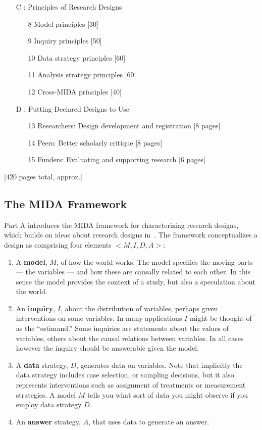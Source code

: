 \documentclass[11pt]{article}
\begin{document}
\begin{framed}
\begin{enumerate}
		\item[C]: Principles of Research Designs
		\begin{enumerate}
			\item[8] Model principles [30]
			\item[9] Inquiry principles [50]
			\item[10] Data strategy principles [60]
			\item[11] Analysis strategy principles [60]
			\item[12] Cross-MIDA principles [40]
		\end{enumerate}
	\item[D]: Putting Declared Designs to Use
				\begin{enumerate}
					\item[13] Researchers: Design development and registration [8 pages]				
					\item[14]  Peers: Better scholarly critique [8 pages]
          \item[15]  Funders: Evaluating and supporting research [6 pages]   
				\end{enumerate}
				
	\end{enumerate}
	[420 pages total, approx.]
\end{framed}


\subsection{The MIDA Framework}

Part A introduces the MIDA framework for characterizing research designs, which builds on ideas about research designs in~\cite{king1994designing}. The framework conceptualizes a design as comprising four elements $<M,I,D,A>$:
\begin{enumerate}
	\item A \textbf{model}, $M$, of how the world works. The model specifies the moving parts --- the variables --- and how these are causally related to each other. In this sense the model provides the context of a study, but also a speculation about the world.    
	\item An \textbf{inquiry}, $I$, about the distribution of variables, perhaps given interventions on some variables.  In many applications $I$ might be thought of as the ``estimand.'' Some inquiries are statements about the values of variables, others about the causal relations between variables. In all cases however the inquiry should be answerable given the model.   
	\item A \textbf{data} strategy, $D$, generates data on variables.  Note that implicitly the data strategy includes case selection, or sampling decisions, but it also represents interventions such as assignment of treatments or measurement strategies. A model $M$ tells you what sort of data you might observe if you employ data strategy $D$.  
	\item An \textbf{answer} strategy, $A$, that uses data to generate an answer.  
\end{enumerate}
\end{document}
